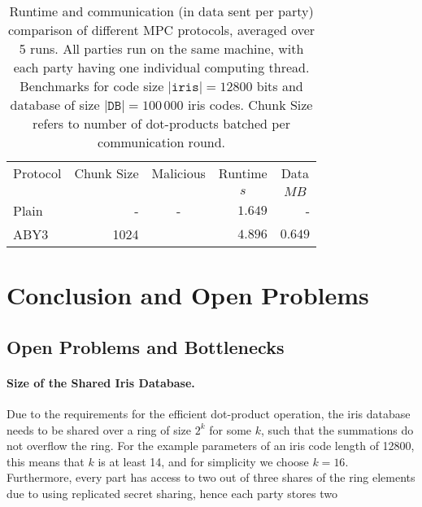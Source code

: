 \documentclass[a4paper,11pt,
]{article}
\newcommand{\xmark}{\ding{55}}%
\begin{document}
\begin{table}[ht]
    \centering
    \caption{Runtime and communication (in data sent per party) comparison of different MPC protocols, averaged over 5 runs. All parties run on the same machine, with each party having one individual computing thread. Benchmarks for code size $|\texttt{iris}| = 12800$ bits and database of size $|\texttt{DB}| = 100\,000$ iris codes. Chunk Size refers to number of dot-products batched per communication round.}
    \label{tab::bench}
    \begin{tabular}{lrcrr}
        \toprule
        \multicolumn{1}{c}{Protocol} & \multicolumn{1}{c}{Chunk Size} & \multicolumn{1}{c}{Malicious} & \multicolumn{1}{c}{Runtime} & \multicolumn{1}{c}{Data} \\
                                     &                                &                               & \multicolumn{1}{c}{$s$}     & \multicolumn{1}{c}{$MB$} \\
        \midrule
        Plain                        & -                              & -                             & $1.649$                     & -                        \\
        ABY3                         & 1024                           & \xmark                        & $4.896$                     & $0.649$                  \\
        \bottomrule
    \end{tabular}
\end{table}

\section{Conclusion and Open Problems}

\subsection{Open Problems and Bottlenecks}

\paragraph{Size of the Shared Iris Database.}
Due to the requirements for the efficient dot-product operation, the iris database needs to be shared over a ring of size $2^k$ for some $k$, such that the summations do not overflow the ring.
For the example parameters of an iris code length of 12800, this means that $k$ is at least 14, and for simplicity we choose $k=16$.
Furthermore, every part has access to two out of three shares of the ring elements due to using replicated secret sharing, hence each party stores two
\end{document}
